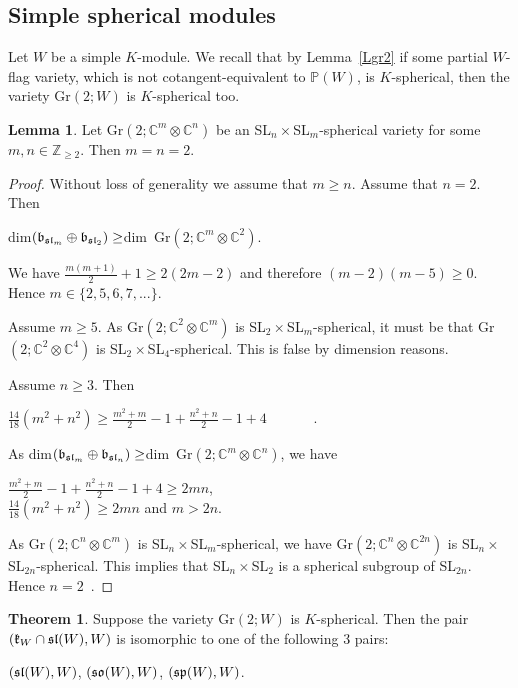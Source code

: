 \documentclass[12pt]{amsart}
\theoremstyle{definition}\newtheorem{theorem}{Theorem}[section]
\newtheorem{lemma}[proposition]{Lemma}
\theoremstyle{definition}\newtheorem{definition}[proposition]{Definition}
\theoremstyle{remark}\newtheorem{example}[proposition]{Example}
\begin{document}
\subsection{Simple spherical modules}\label{SSssph}Let $W$ be a simple $K$-module. We recall that by Lemma~\ref{Lgr2} if some partial $W$-flag variety, which is not cotangent-equivalent to $\mathbb P(W)$, is $K$-spherical, then the variety Gr$(2; W)$ is $K$-spherical too.
\begin{lemma}\label{TensP} Let Gr$(2; \mathbb C^m\otimes\mathbb C^n)$ be an SL$_n\times$SL$_m$-spherical variety for some $m,n\in\mathbb Z_{\ge 2}$. Then $m=n=2$.\end{lemma}
\begin{proof}Without loss of generality we assume that $m\ge n$. Assume that $n=2$. Then \begin{center}dim$(\frak b_{\frak{sl}_m}\oplus\frak b_{\frak{sl}_2})\ge$dim~Gr$(2; \mathbb C^m\otimes\mathbb C^2)$.\end{center} We have $\frac{m(m+1)}{2}+1\ge 2(2m-2)$ and therefore $(m-2)(m-5)\ge 0$. Hence $m\in\{2,5,6,7,...\}$.

Assume $m\ge 5$. As Gr$(2; \mathbb C^2\otimes\mathbb C^m)$ is SL$_2\times$SL$_m$-spherical, it must be that Gr$(2; \mathbb C^2\otimes\mathbb C^4)$ is SL$_2\times$SL$_4$-spherical. This is false by dimension reasons.

Assume $n\ge 3$. Then\begin{center}$\frac{14}{18}(m^2+n^2)\ge\frac{m^2+m}{2}-1+\frac{n^2+n}{2}-1+4\hspace{40pt}.$\end{center}As dim$(\frak b_{\frak{sl}_m}\oplus\frak b_{\frak{sl}_n})\ge$dim~Gr$(2; \mathbb C^m\otimes\mathbb C^n)$, we have \begin{center}$\frac{m^2+m}{2}-1+\frac{n^2+n}{2}-1+4\ge 2mn$,\\ $\frac{14}{18}(m^2+n^2)\ge 2mn$ and $m>2n$.\end{center} As Gr$(2; \mathbb C^n\otimes\mathbb C^m)$ is SL$_n\times$SL$_m$-spherical, we have Gr$(2; \mathbb C^n\otimes\mathbb C^{2n})$ is SL$_n\times$SL$_{2n}$-spherical. This implies that SL$_n\times$SL$_2$ is a spherical subgroup of SL$_{2n}$. Hence $n=2$~\cite{Kr}.\end{proof}
\begin{theorem}\label{Tsgr2}Suppose the variety Gr$(2; W)$ is $K$-spherical. Then the pair $(\frak k_W\cap\frak{sl}(W), W)$ is isomorphic to one of the following 3 pairs:\begin{center}$(\frak{sl}(W), W)$, $(\frak{so}(W), W)$, $(\frak{sp}(W), W)$.\end{center}\end{theorem}
\end{document}
